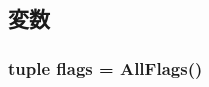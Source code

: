 \subsection{変数}
\hypertarget{namespacem5_1_1debug_a9ceb38153d5c0f156fbeada6dc00ff4f}{
\subsubsection[{flags}]{\setlength{\rightskip}{0pt plus 5cm}tuple {\bf flags} = {\bf AllFlags}()}}
\label{namespacem5_1_1debug_a9ceb38153d5c0f156fbeada6dc00ff4f}
